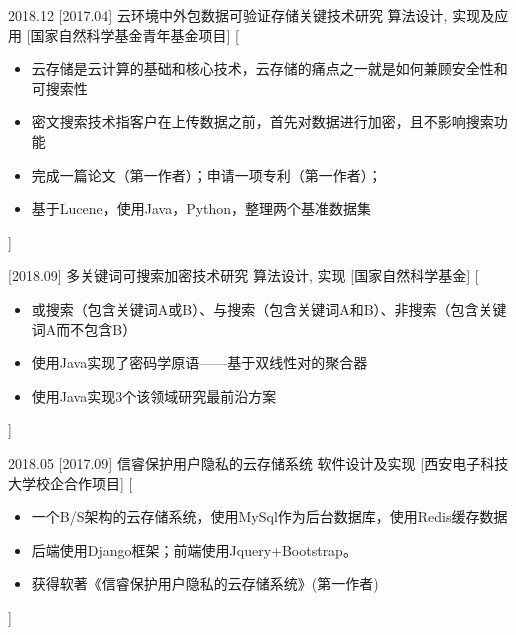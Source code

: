 \documentclass[zh]{resume}
\begin{document}
\begin{experiences}
  \experience
    {2018.12}%
    [2017.04]%
    {云环境中外包数据可验证存储关键技术研究}%
    {算法设计, 实现及应用}%
    [国家自然科学基金青年基金项目]%
    [\begin{itemize}
      \item{\icon{\faFlag}} 云存储是云计算的基础和核心技术，云存储的痛点之一就是如何兼顾安全性和可搜索性
      \item{\icon{\faFlag}} 密文搜索技术指客户在上传数据之前，首先对数据进行加密，且不影响搜索功能
      \item{\icon{\faCheck}} 完成一篇论文（第一作者）；申请一项专利（第一作者）；
      \item{\icon{\faCheck}} 基于Lucene，使用Java，Python，整理两个基准数据集  %
    \end{itemize}]%

  \separator{0.2em}
  
  \experience
    {}
    [2018.09]%
    {多关键词可搜索加密技术研究}%
    {算法设计, 实现}%
    [国家自然科学基金]%
    [\begin{itemize}
      \item{\icon{\faFlag}} 或搜索（包含关键词A或B）、与搜索（包含关键词A和B）、非搜索（包含关键词A而不包含B）
      \item{\icon{\faCheck}} 使用Java实现了密码学原语——基于双线性对的聚合器 
      \item{\icon{\faCheck}} 使用Java实现3个该领域研究最前沿方案     
    \end{itemize}]%


  \separator{0.2em}
  \experience
    {2018.05}%
    [2017.09]%
    {信睿保护用户隐私的云存储系统}%
    {软件设计及实现}%
    [西安电子科技大学校企合作项目]%
    [\begin{itemize}
      \item{\icon{\faFlag}} 一个B/S架构的云存储系统，使用MySql作为后台数据库，使用Redis缓存数据
      \item{\icon{\faFlag}} 后端使用Django框架；前端使用Jquery+Bootstrap。
      \item{\icon{\faCheck}} 获得软著《信睿保护用户隐私的云存储系统》(第一作者)
    \end{itemize}]%




\end{experiences}
\end{document}
